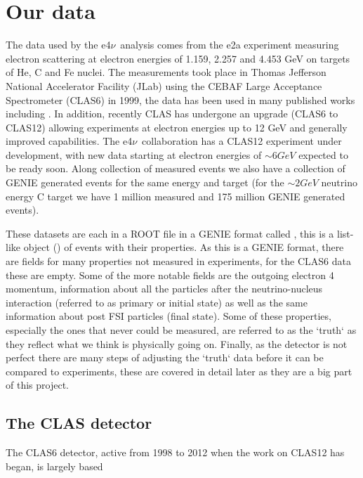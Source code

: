 \documentclass[a4paper,12pt]{article}
\newcommand{\efn}{e4$\nu$}
\newcommand{\verbb}[1]{\text{\verb|#1}}
\begin{document}
\section{Our data}
The data used by the \efn\ analysis comes from the e2a experiment measuring electron scattering at electron energies of 1.159, 2.257 and 4.453 \si{GeV} on targets of He, C and Fe nuclei.
The measurements took place in Thomas Jefferson National Accelerator Facility (JLab) using the CEBAF Large Acceptance Spectrometer (CLAS6) \cite{meckingCEBAFLargeAcceptance2003} in 1999, the data has been used in many published works including \cite{khachatryanElectronbeamEnergyReconstruction2021}.
In addition, recently CLAS has undergone an upgrade (CLAS6 to CLAS12) \cite{burkertCLAS12SpectrometerJefferson2020} allowing experiments at electron energies up to 12 \si{GeV} and generally improved capabilities.
The \efn\ collaboration has a CLAS12 experiment under development, with new data starting at electron energies of $\sim6 \si{GeV}$ expected to be ready soon.
Along collection of measured events we also have a collection of GENIE generated events for the same energy and target (for the $\sim 2\si{GeV}$ neutrino energy C target we have 1 million measured and 175 million GENIE generated events).

These datasets are each in a ROOT file in a GENIE format called \verbb{gst}, this is a list-like object (\verbb{TTree}) of events with their properties.
As this is a GENIE format, there are fields for many properties not measured in experiments, for the CLAS6 data these are empty.
Some of the more notable fields are the outgoing electron 4 momentum, information about all the particles after the neutrino-nucleus interaction (referred to as primary or initial state) as well as the same information about post FSI particles (final state).
Some of these properties, especially the ones that never could be measured, are referred to as the `truth` as they reflect what we think is physically going on.
Finally, as the detector is not perfect there are many steps of adjusting the `truth` data before it can be compared to experiments, these are covered in detail later as they are a big part of this project.

\subsection{The CLAS detector}
The CLAS6 detector, active from 1998 to 2012 when the work on CLAS12 has began, is largely based 
\end{document}
